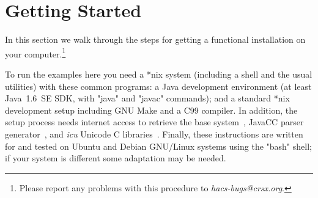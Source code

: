 \documentclass[11pt]{article} %
\begin{document}
\section{Getting Started}
\label{sec:run}

In this section we walk through the steps for getting a functional \HAX installation on your
computer.\footnote{Please report any problems with this procedure to \emph{hacs-bugs@crsx.org}.}

\begin{requirements}
  To run the \HAX examples here you need a *nix system (including a shell and the usual utilities)
  with these common programs: a Java development environment (at least Java~1.6~SE SDK, with "java"
  and "javac" commands); and a standard *nix development setup including GNU Make and a C99
  compiler. In addition, the setup process needs internet access to retrieve the \CRSX base
  system~\cite{crsx}, JavaCC parser generator~\cite{JavaCC}, and \emph{icu} Unicode C
  libraries~\cite{ICU}. Finally, these instructions are written for and tested on Ubuntu and Debian
  GNU/Linux systems using the "bash" shell; if your system is different some adaptation may be
  needed.
\end{requirements}
\end{document}
